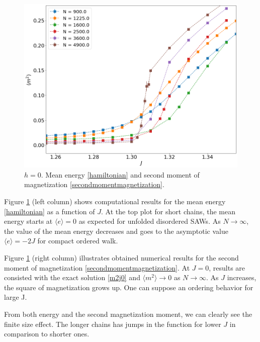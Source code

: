 \begin{figure}[t]
	\includegraphics[scale=0.23]{Images/magnetization2_longchains.png}
	\caption{$h=0$. Mean energy \eqref{hamiltonian} and   second moment of magnetization \eqref{secondmomentmagnetization}. }
	\label{fig:energymagshort}
\end{figure}

 Figure \ref{fig:energymagshort} (left column) shows computational results for the mean energy  \eqref{hamiltonian} as a function of $J$. At the top plot for short chains, the mean energy starts at $\langle e \rangle = 0$ as expected for unfolded disordered SAWs. As $N \rightarrow \infty$, the value of the mean energy decreases and goes to the asymptotic value $\langle e \rangle = -2J$ for compact ordered walk. 
 
  Figure \ref{fig:energymagshort} (right column) illustrates obtained numerical results for the second moment of magnetization \eqref{secondmomentmagnetization}. At $J=0$, results are consisted with the exact solution \eqref{m2j0} and $  \langle m^2 \rangle  \rightarrow 0$ as $N \rightarrow \infty$. As $J$ increases, the square of magnetization grows up. One can suppose an ordering behavior for large J.
  
  From both energy and the second magnetization moment, we can clearly see the finite size effect. The longer chains has jumps in the function for lower $J$ in comparison to shorter ones. 
 
 
